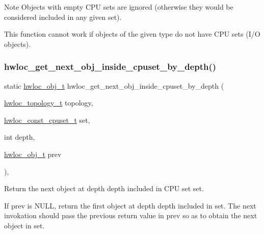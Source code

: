 \begin{DoxyNote}{Note}
Objects with empty C\+PU sets are ignored (otherwise they would be considered included in any given set).

This function cannot work if objects of the given type do not have C\+PU sets (I/O objects). 
\end{DoxyNote}
\mbox{\label{a00195_ga63e3784e7c60fbae5073428cb98ac787}} 
\subsubsection{\texorpdfstring{hwloc\+\_\+get\+\_\+next\+\_\+obj\+\_\+inside\+\_\+cpuset\+\_\+by\+\_\+depth()}{hwloc\_get\_next\_obj\_inside\_cpuset\_by\_depth()}}
{\footnotesize\ttfamily static \hyperlink{a00185_ga79b8ab56877ef99ac59b833203391c7d}{hwloc\+\_\+obj\+\_\+t} hwloc\+\_\+get\+\_\+next\+\_\+obj\+\_\+inside\+\_\+cpuset\+\_\+by\+\_\+depth (\begin{DoxyParamCaption}\item[{\hyperlink{a00186_ga9d1e76ee15a7dee158b786c30b6a6e38}{hwloc\+\_\+topology\+\_\+t}}]{topology,  }\item[{\hyperlink{a00183_ga1f784433e9b606261f62d1134f6a3b25}{hwloc\+\_\+const\+\_\+cpuset\+\_\+t}}]{set,  }\item[{int}]{depth,  }\item[{\hyperlink{a00185_ga79b8ab56877ef99ac59b833203391c7d}{hwloc\+\_\+obj\+\_\+t}}]{prev }\end{DoxyParamCaption})\hspace{0.3cm}{\ttfamily [inline]}, {\ttfamily [static]}}



Return the next object at depth {\ttfamily depth} included in C\+PU set {\ttfamily set}. 

If {\ttfamily prev} is {\ttfamily N\+U\+LL}, return the first object at depth {\ttfamily depth} included in {\ttfamily set}. The next invokation should pass the previous return value in {\ttfamily prev} so as to obtain the next object in {\ttfamily set}.

